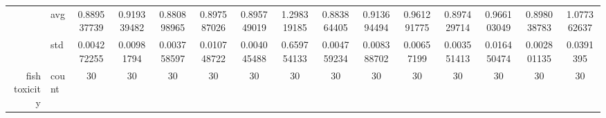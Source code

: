 \begin{table}[H]
{\begin{tabular}{rlccc|c|c|c|c|c|ccccc}
			                                                                               & avg                & \cellcolor[rgb]{ .694,  .831,  .498}0.889537739                                & \cellcolor[rgb]{ 1,  .898,  .514}0.919339482                                   & \cellcolor[rgb]{ .388,  .745,  .482}\textcolor[rgb]{ 0,  .38,  0}{0.880898965} & \cellcolor[rgb]{ .98,  .914,  .514}0.897587026  & \cellcolor[rgb]{ .918,  .894,  .51}0.895749019                                 & \cellcolor[rgb]{ .973,  .412,  .42}1.298319185  & \cellcolor[rgb]{ .49,  .773,  .486}0.883864405                                 & \cellcolor[rgb]{ 1,  .902,  .518}0.913694494    & \cellcolor[rgb]{ .996,  .843,  .506}0.961291775 & \cellcolor[rgb]{ .976,  .914,  .514}0.897429714 & \cellcolor[rgb]{ .996,  .835,  .502}0.966103049 & \cellcolor[rgb]{ 1,  .922,  .518}0.898038783    & \cellcolor[rgb]{ .988,  .694,  .475}1.077362637 \\
			                                                                               & std                & 0.004272255                                                                    & 0.00981794                                                                     & 0.003758597                                                                    & 0.010748722                                     & 0.004045488                                                                    & 0.659754133                                     & 0.004759234                                                                    & 0.008388702                                     & 0.00657199                                      & 0.003551413                                     & 0.016450474                                     & 0.002801135                                     & 0.0391395                                       \\
			fish toxicity                                                                  & count              & 30                                                                             & 30                                                                             & 30                                                                             & 30                                              & 30                                                                             & 30                                              & 30                                                                             & 30                                              & 30                                              & 30                                              & 30                                              & 30                                              & 30                                              \\

\end{tabular}}
\end{table}
